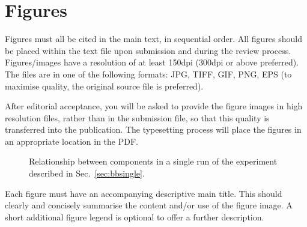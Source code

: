 \section{Figures}\label{sec:figures}

Figures must all be cited in the main text, in sequential order. 
All figures should be placed within the text file upon submission and during
the review process. Figures/images have a resolution of at least 150dpi 
(300dpi or above preferred). The files are in one of the following formats:
JPG, TIFF, GIF, PNG, EPS (to maximise quality,
the original source file is preferred).

After editorial acceptance, you will be asked to provide the figure 
images in high resolution files, rather than in the submission file, 
so that this quality is transferred into the publication.
The typesetting process will place the figures in an appropriate 
location in the PDF.

\begin{figure}[tbp]
  \centering
{}

\caption{Relationship between components in
  a single run of the experiment described in Sec.~\ref{sec:bbsingle}.
\label{fig:bbsingle} 
}
\end{figure}

Each figure must have an accompanying descriptive main title.
This should clearly and concisely summarise the content and/or
use of the figure image.
A short additional figure legend is optional to offer a further description.

